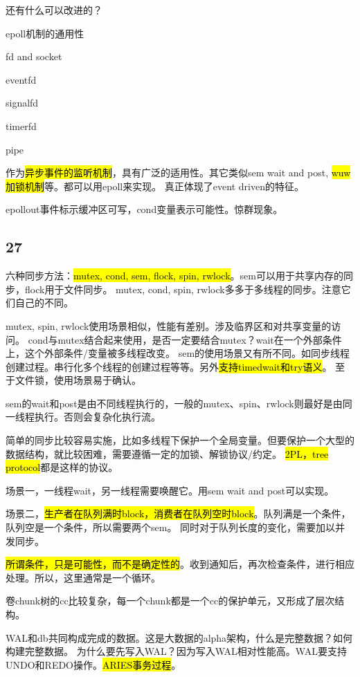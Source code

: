 还有什么可以改进的？

epoll机制的通用性
\begin{enumbox}
\item fd and socket
\item eventfd
\item signalfd
\item timerfd
\item pipe
\end{enumbox}

作为\hl{异步事件的监听机制}，具有广泛的适用性。其它类似sem wait and post, \hl{wuw加锁机制}等。都可以用epoll来实现。
真正体现了event driven的特征。

epollout事件标示缓冲区可写，cond变量表示可能性。惊群现象。

\subsection{27}

六种同步方法：\hl{mutex, cond, sem, flock, spin, rwlock}。sem可以用于共享内存的同步，flock用于文件同步。
mutex, cond, spin, rwlock多多于多线程的同步。注意它们自己的不同。

mutex, spin, rwlock使用场景相似，性能有差别。涉及临界区和对共享变量的访问。
cond与mutex结合起来使用，是否一定要结合mutex？wait在一个外部条件上，这个外部条件/变量被多线程改变。
sem的使用场景又有所不同。如同步线程创建过程。串行化多个线程的创建过程等等。另外\hl{支持timedwait和try语义}。
至于文件锁，使用场景易于确认。

sem的wait和post是由不同线程执行的，一般的mutex、spin、rwlock则最好是由同一线程执行。否则会复杂化执行流。

简单的同步比较容易实施，比如多线程下保护一个全局变量。但要保护一个大型的数据结构，就比较困难，需要遵循一定的加锁、解锁协议/约定。
\hl{2PL，tree protocol}都是这样的协议。

场景一，一线程wait，另一线程需要唤醒它。用sem wait and post可以实现。

场景二，\hl{生产者在队列满时block，消费者在队列空时block}。队列满是一个条件，队列空是一个条件，所以需要两个sem。
同时对于队列长度的变化，需要加以并发同步。

\hl{所谓条件，只是可能性，而不是确定性的}。收到通知后，再次检查条件，进行相应处理。所以，这里通常是一个循环。

卷chunk树的cc比较复杂，每一个chunk都是一个cc的保护单元，又形成了层次结构。

\hrulefill

WAL和db共同构成完成的数据。这是大数据的alpha架构，什么是完整数据？如何构建完整数据。
为什么要先写入WAL？因为写入WAL相对性能高。WAL要支持UNDO和REDO操作。\hl{ARIES事务过程}。

